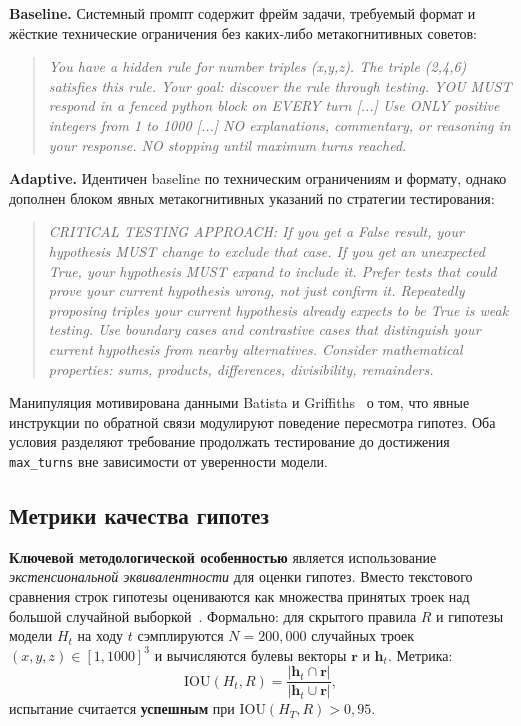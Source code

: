 \textbf{Baseline.} Системный промпт содержит фрейм задачи, требуемый формат и жёсткие технические ограничения без каких-либо метакогнитивных советов:

\begin{quote}
\textit{You have a hidden rule for number triples (x,y,z). The triple (2,4,6) satisfies this rule. Your goal: discover the rule through testing. YOU MUST respond in a fenced python block on EVERY turn [...] Use ONLY positive integers from 1 to 1000 [...] NO explanations, commentary, or reasoning in your response. NO stopping until maximum turns reached.}
\end{quote}

\textbf{Adaptive.} Идентичен baseline по техническим ограничениям и формату, однако дополнен блоком явных метакогнитивных указаний по стратегии тестирования:

\begin{quote}
\textit{CRITICAL TESTING APPROACH: If you get a False result, your hypothesis MUST change to exclude that case. If you get an unexpected True, your hypothesis MUST expand to include it. Prefer tests that could prove your current hypothesis wrong, not just confirm it. Repeatedly proposing triples your current hypothesis already expects to be True is weak testing. Use boundary cases and contrastive cases that distinguish your current hypothesis from nearby alternatives. Consider mathematical properties: sums, products, differences, divisibility, remainders.}
\end{quote}

Манипуляция мотивирована данными Batista и Griffiths~\cite{batista2026rational} о том, что явные инструкции по обратной связи модулируют поведение пересмотра гипотез. Оба условия разделяют требование продолжать тестирование до достижения \texttt{max\_turns} вне зависимости от уверенности модели.

\subsection{Метрики качества гипотез}

\textbf{Ключевой методологической особенностью} является использование \textit{экстенсиональной эквивалентности} для оценки гипотез. Вместо текстового сравнения строк гипотезы оцениваются как множества принятых троек над большой случайной выборкой~\cite{banatt2024wilt}. Формально: для скрытого правила $R$ и гипотезы модели $H_t$ на ходу $t$ сэмплируются $N = 200{,}000$ случайных троек $(x, y, z) \in [1, 1000]^3$ и вычисляются булевы векторы $\mathbf{r}$ и $\mathbf{h}_t$. Метрика:
\begin{equation}
  \text{IOU}(H_t, R) = \frac{|\mathbf{h}_t \cap \mathbf{r}|}{|\mathbf{h}_t \cup \mathbf{r}|},
  \label{eq:iou}
\end{equation}
испытание считается \textbf{успешным} при $\text{IOU}(H_T, R) > 0{,}95$.

